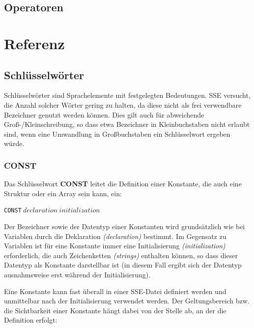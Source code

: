 \documentclass{scrartcl}
\begin{document}
\subsection{Operatoren}

\section{Referenz}

\subsection{Schlüsselwörter}

\noindent Schlüsselwörter sind Sprachelemente mit festgelegten Bedeutungen. SSE versucht, die Anzahl solcher Wörter gering zu halten, da diese nicht als frei verwendbare Bezeichner genutzt werden können. Dies gilt auch für abweichende Groß-/Kleinschreibung, so dass etwa Bezeichner in Kleinbuchstaben nicht erlaubt sind, wenn eine Umwandlung in Großbuchstaben ein Schlüsselwort ergeben würde.

\subsubsection{CONST}

\noindent Das Schlüsselwort \textbf{CONST} leitet die Definition einer Konstante, die auch eine Struktur oder ein Array sein kann, ein:

\vspace{10pt}
\indent \texttt{CONST$~declaration~initialization$}

\vspace{10pt}
\noindent Der Bezeichner sowie der Datentyp einer Konstanten wird grundsätzlich wie bei Variablen durch die Deklaration \textit{(declaration)} bestimmt. Im Gegensatz zu Variablen ist für eine Konstante immer eine Initialisierung \textit{(initialization)} erforderlich, die auch Zeichenketten \textit{(strings)} enthalten können, so dass dieser Datentyp als Konstante darstellbar ist (in diesem Fall ergibt sich der Datentyp ausnahmsweise erst während der Initialisierung).

\vspace{10pt}
\noindent Eine Konstante kann fast überall in einer SSE-Datei definiert werden und unmittelbar nach der Initialisierung verwendet werden. Der Geltungsbereich bzw. die Sichtbarkeit einer Konstante hängt dabei von der Stelle ab, an der die Definition erfolgt:
\end{document}

